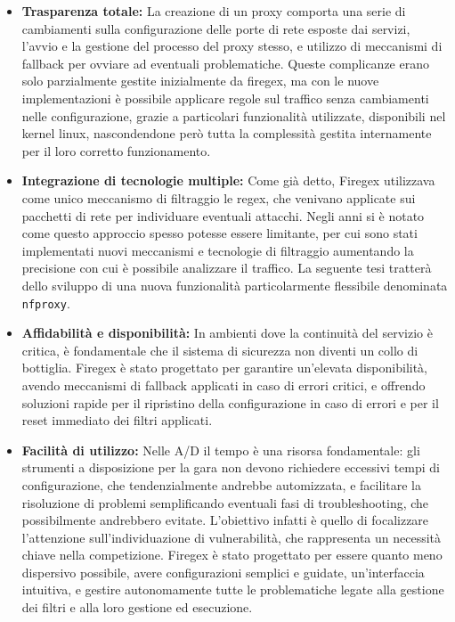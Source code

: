 \begin{itemize}
    \item \textbf{Trasparenza totale:} La creazione di un proxy comporta una serie di cambiamenti sulla configurazione delle porte di rete esposte dai servizi, l'avvio e la gestione del processo del proxy stesso,
    e utilizzo di meccanismi di fallback per ovviare ad eventuali problematiche. Queste complicanze erano solo parzialmente gestite inizialmente da firegex, ma con le nuove implementazioni
    è possibile applicare regole sul traffico senza cambiamenti nelle configurazione, grazie a particolari funzionalità utilizzate, disponibili nel kernel linux, nascondendone però
    tutta la complessità gestita internamente per il loro corretto funzionamento.
    \item \textbf{Integrazione di tecnologie multiple:} Come già detto, Firegex utilizzava come unico meccanismo di filtraggio le regex, che venivano
    applicate sui pacchetti di rete per individuare eventuali attacchi. Negli anni si è notato come questo approccio spesso potesse essere limitante, per cui sono stati
    implementati nuovi meccanismi e tecnologie di filtraggio aumentando la precisione con cui è possibile analizzare il traffico. La seguente tesi tratterà dello sviluppo
    di una nuova funzionalità particolarmente flessibile denominata \texttt{nfproxy}.
    \item \textbf{Affidabilità e disponibilità:} In ambienti dove la continuità del servizio è critica, è fondamentale che il sistema di sicurezza non diventi un
    collo di bottiglia. Firegex è stato progettato per garantire un’elevata disponibilità, avendo meccanismi di fallback applicati in caso di errori critici,
    e offrendo soluzioni rapide per il ripristino della configurazione in caso di errori e per il reset immediato dei filtri applicati.
    \item \textbf{Facilità di utilizzo:} Nelle A/D il tempo è una risorsa fondamentale: gli strumenti a disposizione per la gara non devono
    richiedere eccessivi tempi di configurazione, che tendenzialmente andrebbe automizzata, e facilitare la risoluzione di problemi
    semplificando eventuali fasi di troubleshooting, che possibilmente andrebbero evitate. L'obiettivo infatti è quello di focalizzare l'attenzione sull'individuazione di vulnerabilità,
    che rappresenta un necessità chiave nella competizione. Firegex è stato progettato per essere quanto meno dispersivo possibile,
    avere configurazioni semplici e guidate, un'interfaccia intuitiva, e gestire autonomamente tutte le problematiche legate alla gestione dei filtri e
    alla loro gestione ed esecuzione.
\end{itemize}


